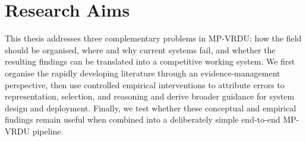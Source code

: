 \documentclass[11pt,twoside,openany]{report}
\begin{document}


\section{Research Aims}

This thesis addresses three complementary problems in MP-VRDU: how the field should be organised, where and why current systems fail, and whether the resulting findings can be translated into a competitive working system. We first organise the rapidly developing literature through an evidence-management perspective, then use controlled empirical interventions to attribute errors to representation, selection, and reasoning and derive broader guidance for system design and deployment. Finally, we test whether these conceptual and empirical findings remain useful when combined into a deliberately simple end-to-end MP-VRDU pipeline.
\end{document}
